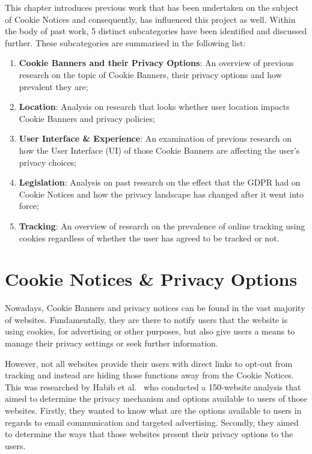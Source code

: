 \documentclass[../main.tex]{subfiles}
\begin{document}
This chapter introduces previous work that has been undertaken on the subject of Cookie Notices and consequently, has influenced this project as well. Within the body of past work, 5 distinct subcategories have been identified and discussed further. These subcategories are summarised in the following list:

\begin{enumerate}
    \item \textbf{Cookie Banners and their Privacy Options}: An overview of previous research on the topic of Cookie Banners, their privacy options and how prevalent they are;
    \item \textbf{Location}: Analysis on research that looks whether user location impacts Cookie Banners and privacy policies;
    \item \textbf{User Interface \& Experience}: An examination of previous research on how the User Interface (UI) of those Cookie Banners are affecting the user’s privacy choices;
    \item \textbf{Legislation}: Analysis on past research on the effect that the GDPR had on Cookie Notices and how the privacy landscape has changed after it went into force;
    \item \textbf{Tracking}: An overview of research on the prevalence of online tracking using cookies regardless of whether the user has agreed to be tracked or not. 
\end{enumerate}

\section{Cookie Notices \& Privacy Options}
Nowadays, Cookie Banners and privacy notices can be found in the vast majority of websites. Fundamentally, they are there to notify users that the website is using cookies, for advertising or other purposes, but also give users a means to manage their privacy settings or seek further information. 

However, not all websites provide their users with direct links to opt-out from tracking and instead are hiding those functions away from the Cookie Notices. This was researched by Habib et al.~\cite{habib2019empirical} who conducted a 150-website analysis that aimed to determine the privacy mechanism and options available to users of those websites. Firstly, they wanted to know what are the options available to users in regards to email communication and targeted advertising. Secondly, they aimed to determine the ways that those websites present their privacy options to the users. 
\end{document}
